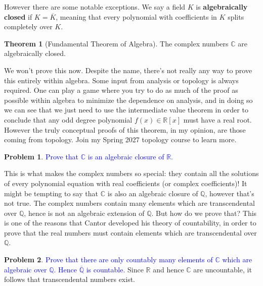 \documentclass[11pt]{article}
\def\QQ{\mathbb{Q}}
\def\RR{\mathbb{R}}
\def\CC{\mathbb{C}}
\theoremstyle{definition}
\newtheorem{theorem}{Theorem}[section]
\newtheorem{problem}{Problem}[section]
\numberwithin{equation}{subsection}
\newcommand{\blue}[1]{\textcolor{blue}{#1}}
\begin{document}
However there are some notable exceptions.
We say a field $K$ is \textbf{algebraically closed} if $K = \overline{K}$, meaning that every polynomial with coefficients in $K$ splits completely over $K$.

\begin{theorem}[Fundamental Theorem of Algebra]
    The complex numbers $\CC$ are algebraically closed.
\end{theorem}

We won't prove this now.
Despite the name, there's not really any way to prove this entirely within algebra.
Some input from analysis or topology is always required.
One can play a game where you try to do as much of the proof as possible within algebra to minimize the dependence on analysis, and in doing so we can see that we just need to use the intermediate value theorem in order to conclude that any odd degree polynomial $f(x) \in \RR[x]$ must have a real root.
However the truly conceptual proofs of this theorem, in my opinion, are those coming from topology.
Join my Spring 2027 topology course to learn more.

\begin{problem}
    \blue{Prove that $\CC$ is an algebraic closure of $\RR$.}
\end{problem}

This is what makes the complex numbers so special: they contain all the solutions of every polynomial equation with real coefficients (or complex coefficients)!
It might be tempting to say that $\CC$ is also an algebraic closure of $\QQ$, however that's not true.
The complex numbers contain many elements which are transcendental over $\QQ$, hence is not an algebraic extension of $\QQ$.
But how do we prove that?
This is one of the reasons that Cantor developed his theory of countability, in order to prove that the real numbers must contain elements which are transcendental over $\QQ$.

\begin{problem}
    \blue{Prove that there are only countably many elements of $\CC$ which are algebraic over $\QQ$.
    Hence $\overline{\QQ}$ is countable.}
    Since $\RR$ and hence $\CC$ are uncountable, it follows that transcendental numbers exist.
\end{problem}
\end{document}

